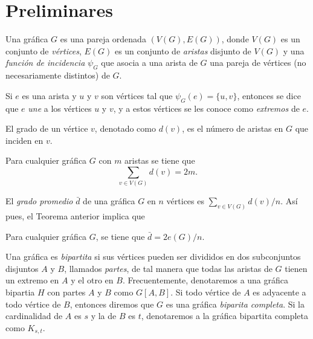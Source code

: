 
\section{Preliminares}
Una gráfica $G$ es una pareja ordenada $(V(G), E(G))$, donde $V(G)$
es un conjunto de \textit{vértices},  $E(G)$ es un conjunto de
\textit{aristas} disjunto de $V(G)$ y una \textit{función de
incidencia} $\psi_G$ que asocia a una arista de $G$ una pareja
de vértices (no necesariamente distintos) de $G$.

Si $e$ es una arista y $u$ y $v$ son vértices tal que $\psi_G(e)
= \{u, v\}$, entonces se dice que $e$ \textit{une} a los vértices
$u$ y $v$, y a estos vértices se les conoce como \textit{extremos} de $e$.


El grado de un vértice $v$, denotado como $d(v)$, es el número de
aristas en $G$ que inciden en $v$.

\begin{theorem} Para cualquier gráfica $G$ con $m$
  aristas se tiene que
  $$\sum_{v \in V(G)} d(v) = 2m.$$
\end{theorem}

El \textit{grado promedio} $\bar{d}$ de una gráfica $G$ en $n$
vértices es $\sum_{ v
\in V(G)} d(v) / n$. Así pues, el Teorema anterior implica que

\begin{corollary}
  Para cualquier gráfica $G$, se tiene que $\bar{d} = 2 e(G) /n.$
\end{corollary}

Una gráfica es \textit{bipartita} si sus vértices pueden ser divididos
en dos subconjuntos disjuntos $A$ y $B$, llamados \textit{partes}, de
tal manera que todas las aristas de $G$ tienen un extremo en $A$ y el
otro en $B$. Frecuentemente, denotaremos a una gráfica bipartia $H$
con partes $A$ y $B$ como $G[A, B]$. Si todo vértice de $A$ es adyacente
a todo vértice de $B$, entonces diremos que $G$ es una gráfica
\textit{biparita completa}.
Si la cardinalidad de $A$ es $s$ y la de $B$ es $t$, denotaremos a la
gráfica bipartita completa como $K_{s, t}$.
